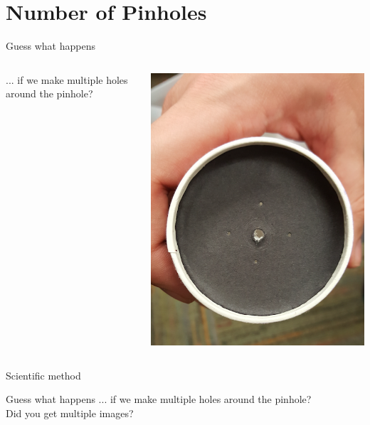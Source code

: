 \section{Number of Pinholes}
\begin{frame}{Guess what happens}
  \begin{columns}
    \begin{column}{0.6\textwidth}
      ... if we make multiple holes around the pinhole?
    \end{column}
    \begin{column}{0.4\textwidth}
      \includegraphics[width=\textwidth]{media/multiple-holes.jpg}
    \end{column}
  \end{columns}
\end{frame}

\begin{frame}[fragile]{Scientific method}
  
\end{frame}

\begin{frame}{Guess what happens}
  ... if we make multiple holes around the pinhole?\\
  \pause
  {\color{red} Did you get multiple images?}
\end{frame}

